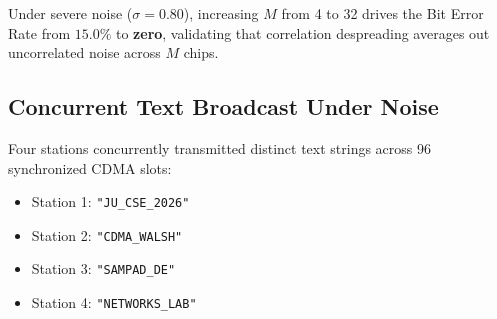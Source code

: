 \documentclass[11pt,a4paper]{article}
\begin{document}
Under severe noise ($\sigma = 0.80$), increasing $M$ from 4 to 32 drives the Bit Error Rate from $15.0\%$ to \textbf{zero}, validating that correlation despreading averages out uncorrelated noise across $M$ chips.

\subsection{Concurrent Text Broadcast Under Noise}
Four stations concurrently transmitted distinct text strings across 96 synchronized CDMA slots:
\begin{itemize}[leftmargin=*]
    \item Station 1: \texttt{"JU\_CSE\_2026"}
    \item Station 2: \texttt{"CDMA\_WALSH"}
    \item Station 3: \texttt{"SAMPAD\_DE"}
    \item Station 4: \texttt{"NETWORKS\_LAB"}
\end{itemize}

\begin{table}[H]
\centering
\caption{Multi-Station Text Broadcast Quality across Noise Levels}
\label{tab:text_broadcast}
\end{table}
\end{document}
